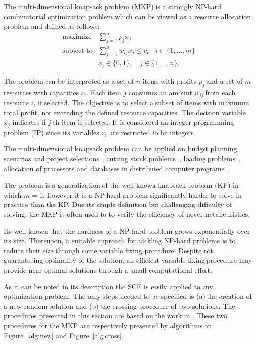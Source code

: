 The multi-dimensional knapsack problem (MKP) is a strongly NP-hard combinatorial
optimization problem which can be viewed as a resource allocation problem and
defined as follows:
\begin{align}
  \text{maximize} & \sum_{j=1}^n p_j x_j \\
  \text{subject to} & \sum_{j=1}^n w_{ij} x_j \leqslant c_i \quad i \in \{1, \ldots, m\}\\
   & x_j \in \{0, 1\}, \quad j \in \{1, \ldots, n\}.
\end{align}

The problem can be interpreted as a set of $n$ items with profits $p_j$
and a set of $m$ resources with capacities $c_i$.
Each item $j$ consumes an amount $w_{ij}$ from each resource $i$, if selected.
The objective is to select a subset of items with maximum total profit,
not exceeding the defined resource capacities.
The decision variable $x_j$ indicates if $j$-th item is selected.
It is considered an integer programming problem (IP) since its variables $x_i$
are restricted to be integers.

The multi-dimensional knapsack problem can be applied on budget planning 
scenarios and project selections~\cite{mcmillan1973resource},
cutting stock problems~\cite{Gilmore-Gomory-1966}, loading problems~\cite{Shih-1979},
allocation of processors and databases in distributed computer programs~\cite{Gavish-Pirckul-1982}.

The problem is a generalization of the well-known knapsack problem (KP) in which
$m = 1$.
However it is a NP-hard problem significantly harder to solve in practice than the KP.
Due its simple definition but challenging difficulty of solving, the MKP is often used to
to verify the efficiency of novel metaheuristics.

Its well known that the hardness of a NP-hard problem grows exponentially over
its size.
Thereupon, a suitable approach for tackling NP-hard problems is to reduce their size
through some variable fixing procedure.
Despite not guaranteeing optimality of the solution, an efficient variable
fixing procedure may provide near optimal solutions through a small computational effort.

As it can be noted in its description the SCE is easily applied to any
optimization problem.
The only steps needed to be specified is (a) the creation of a new random
solution and (b) the crossing procedure of two solutions.
The procedures presented in this section are based
on the work in \cite{baroni2015shuffled}.
These two procedures for the MKP are respectively presented by algorithms on
Figure~\ref{alg:new} and Figure~\ref{alg:cross}.


